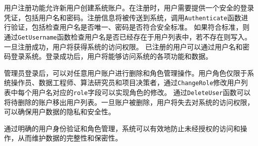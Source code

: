 \par 用户注册功能允许新用户创建系统账户。在注册时，用户需要提供一个安全的登录凭证，包括用户名和密码。注册信息将被传送到系统，调用\texttt{Authenticate}函数进行验证，包括检查用户名是否唯一、密码是否符合安全标准。
如果符合标准，则通过\texttt{GetUsername}函数检查用户名是否已经存在于用户列表中，若不存在则写入。一旦注册成功，用户将获得系统的访问权限。
已注册的用户可以通过用户名和密码登录系统。登录成功后，用户将能够访问系统的各项功能和数据。

\par 管理员登录后，可以对任意用户账户进行删除和角色管理操作。用户角色仅限于系统操作员、数据工程师、算法研究员和项目决策者，通过\texttt{ChangeRole}修改用户列表中每个用户名对应的\texttt{role}字段可以实现角色的修改。
通过\texttt{DeleteUser}函数可以将待删除的账户移出用户列表。一旦账户被删除，用户将失去对系统的访问权限，可以确保用户数据的隐私和安全性。

\par 通过明确的用户身份验证和角色管理，系统可以有效地防止未经授权的访问和操作，从而维护数据的完整性和保密性。